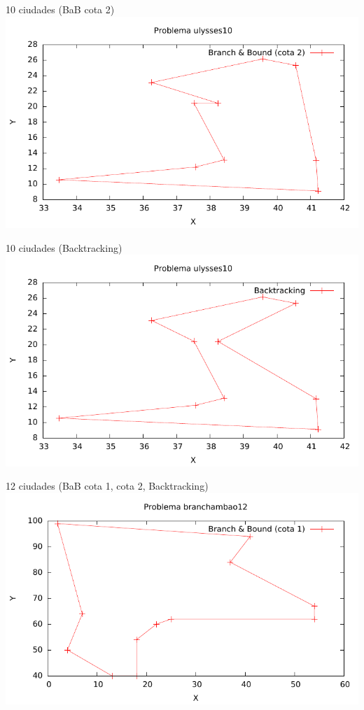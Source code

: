 \begin{frame}{10 ciudades (BaB cota 2)}
	\includegraphics[width=\textwidth]{img/ulysses10_tsp_2}
\end{frame}

\begin{frame}{10 ciudades (Backtracking)}
	\includegraphics[width=\textwidth]{img/ulysses10_tsp_3}
\end{frame}

\begin{frame}{12 ciudades (BaB cota 1, cota 2, Backtracking)}
	\includegraphics[width=\textwidth]{img/branchambao12_tsp_1}
\end{frame}

